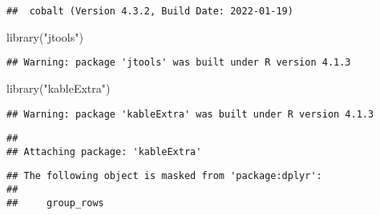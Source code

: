 \documentclass[
]{article}
\newenvironment{Shaded}{\begin{snugshade}}{\end{snugshade}}
\newcommand{\FunctionTok}[1]{\textcolor[rgb]{0.00,0.00,0.00}{#1}}
\newcommand{\NormalTok}[1]{#1}
\newcommand{\StringTok}[1]{\textcolor[rgb]{0.31,0.60,0.02}{#1}}
\begin{document}
\begin{verbatim}
##  cobalt (Version 4.3.2, Build Date: 2022-01-19)
\end{verbatim}

\begin{Shaded}
\begin{Highlighting}[]
\FunctionTok{library}\NormalTok{(}\StringTok{"jtools"}\NormalTok{)}
\end{Highlighting}
\end{Shaded}

\begin{verbatim}
## Warning: package 'jtools' was built under R version 4.1.3
\end{verbatim}

\begin{Shaded}
\begin{Highlighting}[]
\FunctionTok{library}\NormalTok{(}\StringTok{"kableExtra"}\NormalTok{)}
\end{Highlighting}
\end{Shaded}

\begin{verbatim}
## Warning: package 'kableExtra' was built under R version 4.1.3
\end{verbatim}

\begin{verbatim}
## 
## Attaching package: 'kableExtra'
\end{verbatim}

\begin{verbatim}
## The following object is masked from 'package:dplyr':
## 
##     group_rows
\end{verbatim}
\end{document}
